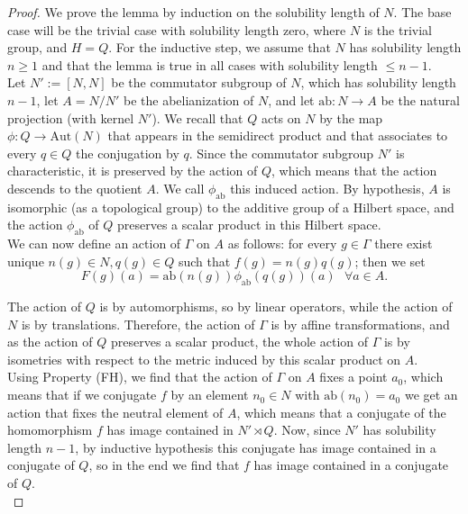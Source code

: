 \documentclass{article}
\theoremstyle{definition}
\theoremstyle{remark}
\theoremstyle{plain}
\begin{document}
\begin{proof}
    We prove the lemma by induction on the solubility length of $N$. The base case will be the trivial case with solubility length zero, where $N$ is the trivial group, and $H=Q$. For the inductive step, we assume that $N$ has solubility length $n\geq 1$ and that the lemma is true in all cases with solubility length $\leq n-1$. \\

    Let $N':=[N,N]$ be the commutator subgroup of $N$, which has solubility length $n-1$, let $A=N/N'$ be the abelianization of $N$, and let $\mathrm{ab}: N\rightarrow A$ be the natural projection (with kernel $N'$). We recall that $Q$ acts on $N$ by the map $\phi: Q\rightarrow\mathrm{Aut}(N)$ that appears in the semidirect product and that associates to every $q\in Q$ the conjugation by $q$. Since the commutator subgroup $N'$ is characteristic, it is preserved by the action of $Q$, which means that the action descends to the quotient $A$. We call $\phi_{\mathrm{ab}}$ this induced action. By hypothesis, $A$ is isomorphic (as a topological group) to the additive group of a Hilbert space, and the action $\phi_{\mathrm{ab}}$ of $Q$ preserves a scalar product in this Hilbert space. \\

    We can now define an action of $\Gamma$ on $A$ as follows: for every $g\in \Gamma$ there exist unique $n(g)\in N, q(g)\in Q$ such that $f(g)=n(g)q(g)$; then we set $$F(g)(a)=\mathrm{ab}(n(g))\phi_{\mathrm{ab}}(q(g))(a)\ \ \ \forall a\in A.$$
    
    The action of $Q$ is by automorphisms, so by linear operators, while the action of $N$ is by translations. Therefore, the action of $\Gamma$ is by affine transformations, and as the action of $Q$ preserves a scalar product, the whole action of $\Gamma$ is by isometries with respect to the metric induced by this scalar product on $A$. \\
    
    Using Property (FH), we find that the action of $\Gamma$ on $A$ fixes a point $a_0$, which means that if we conjugate $f$ by an element $n_0\in N$ with $\mathrm{ab}(n_0)=a_0$ we get an action that fixes the neutral element of $A$, which means that a conjugate of the homomorphism $f$ has image contained in $N'\rtimes Q$. Now, since $N'$ has solubility length $n-1$, by inductive hypothesis this conjugate has image contained in a conjugate of $Q$, so in the end we find that $f$ has image contained in a conjugate of $Q$. \\
    
\end{proof}
\end{document}
